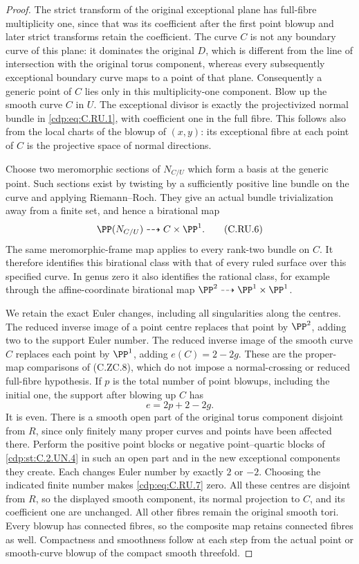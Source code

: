 \begin{proof}
The strict transform of the original exceptional plane has full-fibre
multiplicity one, since that was its coefficient after the first point
blowup and later strict transforms retain the coefficient. The curve
$C$ is not any boundary curve of this plane: it dominates the original
$D$, which is different from the line of intersection with the original
torus component, whereas every subsequently exceptional boundary curve
maps to a point of that plane. Consequently a generic point of $C$ lies
only in this multiplicity-one component. Blow up the smooth curve $C$ in
$U$. The exceptional divisor is exactly the projectivized normal bundle
in \eqref{cdp:eq:C.RU.1}, with coefficient one in the full fibre. This follows also
from the local charts of the blowup of $(x,y)$: its exceptional fibre at
each point of $C$ is the projective space of normal directions.

Choose two meromorphic sections of $N_{C/U}$ which form a basis at the
generic point. Such sections exist by twisting by a sufficiently positive
line bundle on the curve and applying Riemann--Roch. They give an actual
bundle trivialization away from a finite set, and hence a birational map
\[
                         \PP(N_{C/U})\dashrightarrow C\times\PP^1.
\tag{C.RU.6}\label{cdp:eq:C.RU.6}
\]
The same meromorphic-frame map applies to every rank-two bundle on $C$.
It therefore identifies this birational class with that of every ruled
surface over this specified curve. In genus zero it also identifies the
rational class, for example through the affine-coordinate birational map
$\PP^2\dashrightarrow\PP^1\times\PP^1$.

We retain the exact Euler changes, including all singularities along the
centres. The reduced inverse image of a point centre replaces that point
by $\PP^2$, adding two to the support Euler number. The reduced inverse
image of the smooth curve $C$ replaces each point by $\PP^1$, adding
$e(C)=2-2g$. These are the proper-map comparisons of (C.ZC.8), which do
not impose a normal-crossing or reduced full-fibre hypothesis. If $p$ is
the total number of point blowups, including the initial one, the support
after blowing up $C$ has
\[
                              e=2p+2-2g.
\tag{C.RU.7}\label{cdp:eq:C.RU.7}
\]
It is even. There is a smooth open part of the original torus component
disjoint from $R$, since only finitely many proper curves and points have
been affected there. Perform the positive point blocks or negative
point--quartic blocks of \ref{cdp:st:C.2.UN.4} in such an open part and in the new
exceptional components they create. Each changes Euler number by exactly
$2$ or $-2$. Choosing the indicated finite number makes \eqref{cdp:eq:C.RU.7} zero.
All these centres are disjoint from $R$, so the displayed smooth component,
its normal projection to $C$, and its coefficient one are unchanged.
All other fibres remain the original smooth tori. Every blowup has
connected fibres, so the composite map retains connected fibres as well.
Compactness and smoothness follow at each step from the actual point or
smooth-curve blowup of the compact smooth threefold.


\end{proof}
